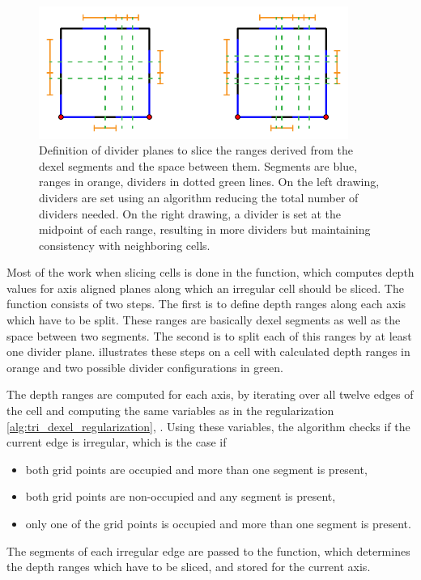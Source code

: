 \begin{figure}
	\centering
	\includegraphics[width=0.9\textwidth]{images/cellslicing_dividers}
	\caption[Divider plane configurations]{
		Definition of divider planes to slice the ranges derived from the dexel segments and the space between them.
		Segments are blue, ranges in orange, dividers in dotted green lines.
		On the left drawing, dividers are set using an algorithm reducing the total number of dividers needed.
		On the right drawing, a divider is set at the midpoint of each range, resulting in more dividers but maintaining consistency with neighboring cells.
	}
	\label{fig:cellslicing_dividers}
\end{figure}

Most of the work when slicing cells is done in the  function, which computes depth values for axis aligned planes along which an irregular cell should be sliced.
The function consists of two steps.
The first is to define depth ranges along each axis which have to be split.
These ranges are basically dexel segments as well as the space between two segments.
The second is to split each of this ranges by at least one divider plane.
 illustrates these steps on a cell with calculated depth ranges in orange and two possible divider configurations in green.

The depth ranges are computed for each axis, by iterating over all twelve edges of the cell and computing the same variables as in the regularization \cref{alg:tri_dexel_regularization}, .
Using these variables, the algorithm checks if the current edge is irregular, which is the case if
\begin{itemize}
	\item both grid points are occupied and more than one segment is present,
	\item both grid points are non-occupied and any segment is present,
	\item only one of the grid points is occupied and more than one segment is present.
\end{itemize}
The segments of each irregular edge are passed to the  function, which determines the depth ranges which have to be sliced, and stored for the current axis.

